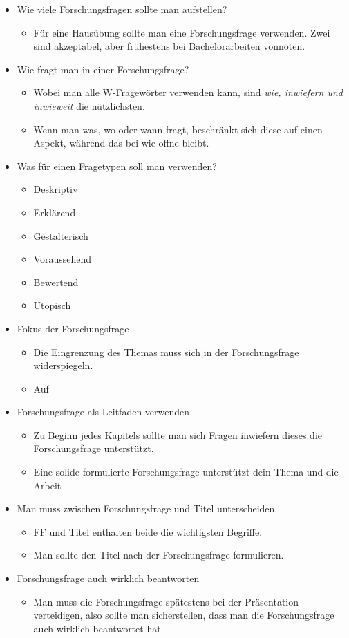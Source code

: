 \documentclass{article}
\begin{document}
	\begin{itemize}
		\item{Wie viele Forschungsfragen sollte man aufstellen?}
		\begin{itemize}
			\item{Für eine Hausübung sollte man eine Forschungsfrage verwenden. Zwei sind akzeptabel, aber frühestens bei Bachelorarbeiten vonnöten.}
		\end{itemize}
		\item{Wie fragt man in einer Forschungsfrage?}
		\begin{itemize}
			\item{Wobei man alle W-Fragewörter verwenden kann, sind \textit{wie, inwiefern und inwieweit} die nützlichsten.}
			\item{Wenn man was, wo oder wann fragt, beschränkt sich diese auf einen Aspekt, während das bei wie offne bleibt.}
		\end{itemize}
		\item{Was für einen Fragetypen soll man verwenden?}
		\begin{itemize}
			\item{Deskriptiv}
			\item{Erklärend}
			\item{Gestalterisch}
			\item{Voraussehend}
			\item{Bewertend}
			\item{Utopisch}
		\end{itemize}
		\item{Fokus der Forschungsfrage}
		\begin{itemize}
			\item{Die Eingrenzung des Themas muss sich in der Forschungsfrage widerspiegeln.}
			\item{Auf}
		\end{itemize}
		\item{Forschungsfrage als Leitfaden verwenden}
		\begin{itemize}
			\item{Zu Beginn jedes Kapitels sollte man sich Fragen inwiefern dieses die Forschungsfrage unterstützt.}
			\item{Eine solide formulierte Forschungsfrage unterstützt dein Thema und die Arbeit}
		\end{itemize}
		\item{Man muss zwischen Forschungsfrage und Titel unterscheiden.}
		\begin{itemize}
			\item{FF und Titel enthalten beide die wichtigsten Begriffe.}
			\item{Man sollte den Titel nach der Forschungsfrage formulieren.}
		\end{itemize}
		\item{Forschungsfrage auch wirklich beantworten}
		\begin{itemize}
			\item{Man muss die Forschungsfrage spätestens bei der Präsentation verteidigen, also sollte man sicherstellen, dass man die Forschungsfrage auch wirklich beantwortet hat.}
		\end{itemize}
	\end{itemize}
\end{document}
